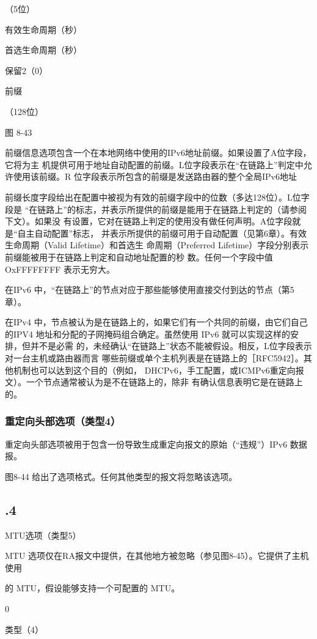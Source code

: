 （5位）

有效生命周期（秒）

首选生命周期（秒）

保留2（0）

前缀

（128位）

图 8-43

前缀信息选项包含一个在本地网络中使用的IPv6地址前缀。如果设置了A位字段，它将为主
机提供可用于地址自动配置的前缀。L位字段表示在“在链路上”判定中允许使用该前缀。R
位字段表示所包含的前缀是发送路由器的整个全局IPv6地址

前缀长度字段给出在配置中被视为有效的前缀字段中的位数（多达128位）。L位字段是
“在链路上”的标志，并表示所提供的前缀是能用于在链路上判定的（请参阅下文）。如果没
有设置，它对在链路上判定的使用没有做任何声明。A位字段就是“自主自动配置”标志，
并表示所提供的前缀可用于自动配置（见第6章）。有效生命周期（Valid Lifetime）和首选生
命周期（Preferred Lifetime）字段分别表示前缀能被用于在链路上判定和自动地址配置的秒
数。任何一个字段中值 OxFFFFFFFF 表示无穷大。

在IPv6 中，“在链路上”的节点对应于那些能够使用直接交付到达的节点（第5章）。

在IPv4 中，节点被认为是在链路上的，如果它们有一个共同的前缀，由它们自己的IPV4
地址和分配的子网掩码组合确定。虽然使用 IPv6 就可以实现这样的安排，但并不是必需
的，未经确认“在链路上”状态不能被假设。相反，L位字段表示对一台主机或路由器而言
哪些前缀或单个主机列表是在链路上的［RFC5942］。其他机制也可以达到这个目的（例如，
DHCPv6，手工配置，或ICMPv6重定向报文）。一个节点通常被认为是不在链路上的，除非
有确认信息表明它是在链路上的。

\subsubsection{重定向头部选项（类型4）}
重定向头部选项被用于包含一份导致生成重定向报文的原始（“违规”）IPv6 数据报。

图8-44 给出了选项格式。任何其他类型的报文将忽略该选项。

\subsection{.4}
MTU选项（类型5）

MTU 选项仅在RA报文中提供，在其他地方被忽略（参见图8-45）。它提供了主机使用

的 MTU，假设能够支持一个可配置的 MTU。

0

类型（4）

